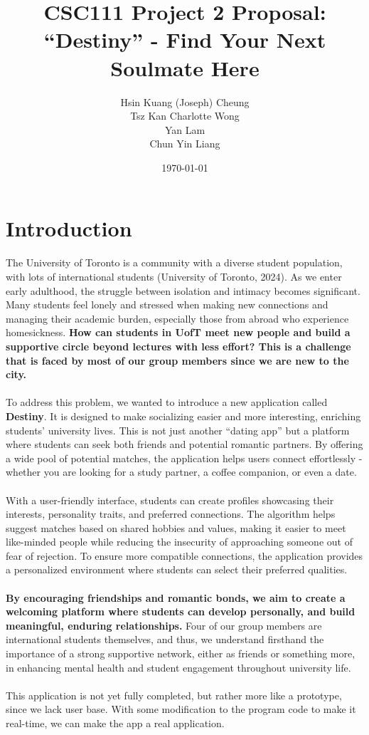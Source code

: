 \documentclass[fontsize=11pt]{article}
\title{CSC111 Project 2 Proposal: \\ \textbf{“Destiny” - Find Your Next Soulmate Here}}
\author{Hsin Kuang (Joseph) Cheung \\ Tsz Kan Charlotte Wong \\ Yan Lam \\ Chun Yin Liang}
\date{\today}
\begin{document}
\maketitle

\section{Introduction}

The University of Toronto is a community with a diverse student population, with lots of international students (University of Toronto, 2024).
As we enter early adulthood, the struggle between isolation and intimacy becomes significant.
Many students feel lonely and stressed when making new connections and managing their academic burden, especially those from abroad who experience homesickness.
\textbf{How can students in UofT meet new people and build a supportive circle beyond lectures with less effort?
This is a challenge that is faced by most of our group members since we are new to the city.}
\\
\\
To address this problem, we wanted to introduce a new application called \textbf{Destiny}.
It is designed to make socializing easier and more interesting, enriching students’ university lives.
This is not just another “dating app” but a platform where students can seek both friends and potential romantic partners. By offering a wide pool of potential matches, the application helps users connect effortlessly - whether you are looking for a study partner, a coffee companion, or even a date.
\\
\\
With a user-friendly interface, students can create profiles showcasing their interests, personality traits, and preferred connections.
The algorithm helps suggest matches based on shared hobbies and values, making it easier to meet like-minded people while
reducing the insecurity of approaching someone out of fear of rejection.
To ensure more compatible connections, the application provides a personalized environment where students can select their preferred qualities.
\\
\\
\textbf{By encouraging friendships and romantic bonds, we aim to create a welcoming platform where students can develop personally, and build meaningful, enduring relationships.}
Four of our group members are international students themselves, and thus, we understand firsthand the importance of a strong supportive network, either as friends or something more, in enhancing mental health and student engagement throughout university life.
\\
\\
This application is not yet fully completed, but rather more like a prototype, since we lack user base.
With some modification to the program code to make it real-time, we can make the app a real application.
\end{document}
